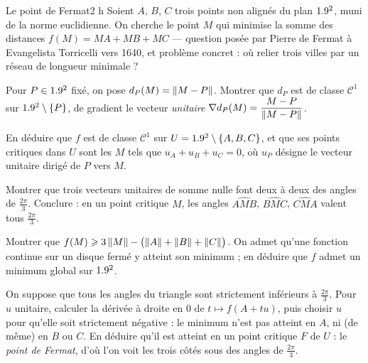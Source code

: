

\begin{defi}{Le point de Fermat}{2 h}
Soient $A$, $B$, $C$ trois points non alignés du plan $1.9^{2}$, muni de la
norme euclidienne. On cherche le point $M$ qui minimise la somme des
distances $f(M)=MA+MB+MC$ — question posée par Pierre de Fermat à
Evangelista Torricelli vers 1640, et problème concret : où relier trois
villes par un réseau de longueur minimale ?

\begin{questions}
  \item Pour $P\in1.9^{2}$ fixé, on pose $d_P(M)=\left\lVert M-P\right\rVert$. Montrer que
    $d_P$ est de classe $\mathcal{C}^{1}$ sur $1.9^{2}\setminus\left\{P\right\}$, de
    gradient le vecteur \emph{unitaire}
    $\nabla d_P(M)=\dfrac{M-P}{\left\lVert M-P\right\rVert}$.
  \item En déduire que $f$ est de classe $\mathcal{C}^{1}$ sur
    $U=1.9^{2}\setminus\left\{A,B,C\right\}$, et que ses points critiques dans $U$
    sont les $M$ tels que $u_A+u_B+u_C=0$, où $u_P$ désigne le vecteur
    unitaire dirigé de $P$ vers $M$.
  \item Montrer que trois vecteurs unitaires de somme nulle font deux à deux
    des angles de $\frac{2\pi}{3}$. Conclure : en un point critique $M$, les
    angles $\widehat{AMB}$, $\widehat{BMC}$, $\widehat{CMA}$ valent tous
    $\frac{2\pi}{3}$.
\end{questions}

\begin{questions}[resume]
  \item Montrer que $f(M)\geqslant3\left\lVert M\right\rVert-\bigl(\left\lVert A\right\rVert+\left\lVert B\right\rVert+\left\lVert C\right\rVert\bigr)$.
    On admet qu'une fonction continue sur un disque fermé y atteint son
    minimum ; en déduire que $f$ admet un minimum global sur $1.9^{2}$.
  \item On suppose que tous les angles du triangle sont strictement
    inférieurs à $\frac{2\pi}{3}$. Pour $u$ unitaire, calculer la dérivée à
    droite en $0$ de $t\mapsto f(A+tu)$, puis choisir $u$ pour qu'elle soit
    strictement négative : le minimum n'est pas atteint en $A$, ni (de
    même) en $B$ ou $C$. En déduire qu'il est atteint en un point critique
    $F$ de $U$ : le \emph{point de Fermat}, d'où l'on voit les trois côtés
    sous des angles de $\frac{2\pi}{3}$.
\end{questions}


\end{defi}
